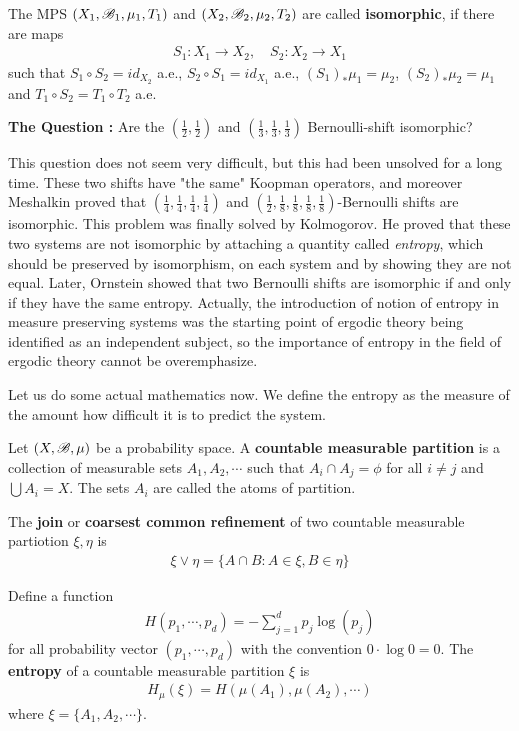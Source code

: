 \documentclass[12pt,a4paper]{report}
\begin{document}
 The MPS $(X_1, \mathscr{B}_1, \mu_1, T_1)$ and $(X_2,\mathscr{B}_2, \mu_2, T_2)$ are called \textbf{isomorphic}, if there are maps
\begin{align*}
S_1 : X_1\rightarrow X_2,\quad S_2 : X_2 \rightarrow X_1
\end{align*}
such that $S_1 \circ S_2 = id_{X_2}$ a.e., $S_2 \circ S_1 = id_{X_1}$ a.e., $(S_1)_* \mu_1 =\mu_2$, $(S_2)_* \mu_2 =\mu_1$ and $T_1 \circ S_2 = T_1 \circ T_2$ a.e.
\s

\textbf{The Question :} Are the $(\frac{1}{2}, \frac{1}{2})$ and $(\frac{1}{3},\frac{1}{3},\frac{1}{3})$ Bernoulli-shift isomorphic?
\s

This question does not seem very difficult, but this had been unsolved for a long time. These two shifts have "the same" Koopman operators, and moreover Meshalkin proved that $(\frac{1}{4},\frac{1}{4},\frac{1}{4},\frac{1}{4})$ and $(\frac{1}{2},\frac{1}{8},\frac{1}{8},\frac{1}{8},\frac{1}{8})$-Bernoulli shifts are isomorphic. This problem was finally solved by Kolmogorov. He proved that these two systems are not isomorphic by attaching a quantity called \emph{entropy}, which should be preserved by isomorphism, on each system and by showing they are not equal. Later, Ornstein showed that two Bernoulli shifts are isomorphic if and only if they have the same entropy. Actually, the introduction of notion of entropy in measure preserving systems was the starting point of ergodic theory being identified as an independent subject, so the importance of entropy in the field of ergodic theory cannot be overemphasize.
\s

Let us do some actual mathematics now. We define the entropy as the measure of the amount how difficult it is to predict the system.
\s

 Let $(X,\mathscr{B}, \mu)$ be a probability space. A \textbf{countable measurable partition} is a collection of measurable sets $A_1, A_2, \cdots$ such that $A_i \cap A_j =\phi$ for all $i\neq j$ and $\bigcup A_i = X$. The sets $A_i$ are called the atoms of partition. 

\quad The \textbf{join} or \textbf{coarsest common refinement} of two countable measurable partiotion $\xi, \eta$ is
\begin{align*}
\xi \vee \eta = \{A \cap B : A\in \xi, B \in \eta \}
\end{align*}

\quad Define a function
\begin{align*}
H(p_1, \cdots, p_d) = - \sum_{j=1}^d p_j \log (p_j)
\end{align*}
for all probability vector $(p_1, \cdots, p_d)$ with the convention $0 \cdot \log 0 =0$. The \textbf{entropy} of a countable measurable partition $\xi$ is
\begin{align*}
H_{\mu}(\xi) = H(\mu(A_1), \mu(A_2), \cdots)
\end{align*}
where $\xi = \{A_1, A_2, \cdots \}$.
\end{document}
